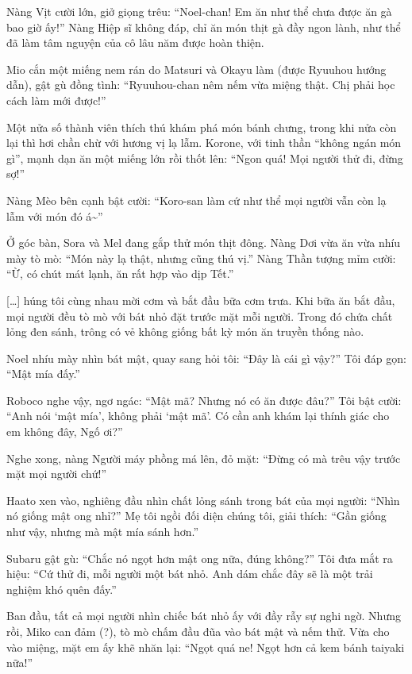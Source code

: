 \documentclass[../main.tex]{subfiles}
\begin{document}
Nàng Vịt cười lớn, giở giọng trêu: ``Noel-chan! Em ăn như thể chưa được ăn gà bao giờ ấy!'' Nàng Hiệp sĩ không đáp, chỉ ăn món thịt gà đầy ngon lành, như thể đã làm tâm nguyện của cô lâu năm được hoàn thiện.

Mio cắn một miếng nem rán do Matsuri và Okayu làm (được Ryuuhou hướng dẫn), gật gù đồng tình: ``Ryuuhou-chan nêm nếm vừa miệng thật. Chị phải học cách làm mới được!''

Một nửa số thành viên thích thú khám phá món bánh chưng, trong khi nửa còn lại thì hơi chần chừ với hương vị lạ lẫm. Korone, với tinh thần ``không ngán món gì'', mạnh dạn ăn một miếng lớn rồi thốt lên: ``Ngon quá! Mọi người thử đi, đừng sợ!''

Nàng Mèo bên cạnh bật cười: ``Koro-san làm cứ như thể mọi người vẫn còn lạ lẫm với món đó á\~{}''

Ở góc bàn, Sora và Mel đang gắp thử món thịt đông. Nàng Dơi vừa ăn vừa nhíu mày tò mò: ``Món này lạ thật, nhưng cũng thú vị.'' Nàng Thần tượng mỉm cười: ``Ừ, có chút mát lạnh, ăn rất hợp vào dịp Tết.''

[\dots] húng tôi cùng nhau mời cơm và bắt đầu bữa cơm trưa. Khi bữa ăn bắt đầu, mọi người đều tò mò với bát nhỏ đặt trước mặt mỗi người. Trong đó chứa chất lỏng đen sánh, trông có vẻ không giống bất kỳ món ăn truyền thống nào.

Noel nhíu mày nhìn bát mật, quay sang hỏi tôi: ``Đây là cái gì vậy?'' Tôi đáp gọn: ``Mật mía đấy.''

Roboco nghe vậy, ngơ ngác: ``Mật mã? Nhưng nó có ăn được đâu?'' Tôi bật cười: ``Anh nói `mật mía', không phải `mật mã'. Có cần anh khám lại thính giác cho em không đây, Ngố ơi?''

Nghe xong, nàng Người máy phồng má lên, đỏ mặt: ``Đừng có mà trêu vậy trước mặt mọi người chứ!''

Haato xen vào, nghiêng đầu nhìn chất lỏng sánh trong bát của mọi người: ``Nhìn nó giống mật ong nhỉ?'' Mẹ tôi ngồi đối diện chúng tôi, giải thích: ``Gần giống như vậy, nhưng mà mật mía sánh hơn.''

Subaru gật gù: ``Chắc nó ngọt hơn mật ong nữa, đúng không?'' Tôi đưa mắt ra hiệu: ``Cứ thử đi, mỗi người một bát nhỏ. Anh dám chắc đây sẽ là một trải nghiệm khó quên đấy.''

Ban đầu, tất cả mọi người nhìn chiếc bát nhỏ ấy với đầy rẫy sự nghi ngờ. Nhưng rồi, Miko can đảm (?), tò mò chấm đầu đũa vào bát mật và nếm thử. Vừa cho vào miệng, mặt em ấy khẽ nhăn lại: ``Ngọt quá ne! Ngọt hơn cả kem bánh taiyaki nữa!''
\end{document}

